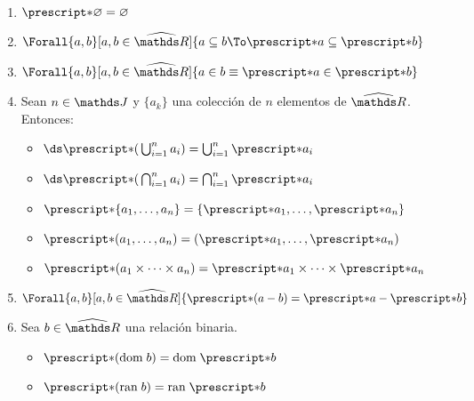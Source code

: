 \begin{lemma}\label{lema:stR}~
  \begin{enumerate}
    \item $\st{\varnothing} = \varnothing$
    \item $\Forall{a,b}[a,b\in\Rh]{a \subseteq b \To \st{a} \subseteq \st{b}}$
    \item $\Forall{a,b}[a,b\in\Rh]{a\in b \equiv \st{a} \in \st{b}}$
    \item Sean $n\in\J$ y $\{a_k\}$ una colección de $n$ elementos de
          $\Rh$. Entonces:
          \begin{itemize}
            \item $\ds\st{\left(\,\bigcup_{i=1}^n a_i\right)}=\bigcup_{i=1}^n \st{a_i}$
            \item $\ds\st{\left(\,\bigcap_{i=1}^n a_i\right)}=\bigcap_{i=1}^n \st{a_i}$
            \item $\st{\{a_1,\dots,a_n\}} = \{\st{a_1},\dots,\st{a_n}\}$
            \item $\st{(a_1,\dots,a_n)} = (\st{a_1},\dots,\st{a_n})$
            \item $\st{(a_1 \times \dots \times a_n)} = 
                    \st{a_1} \times \dots \times \st{a_n}$
          \end{itemize}
    \item $\Forall{a,b}[a,b\in\Rh]{\st{(a - b)} = \st{a} - \st{b}}$
    \item Sea $b\in\Rh$ una relación binaria.
          \begin{itemize}
            \item $\st{(\dom b)} = \dom \st{b}$
            \item $\st{(\ran b)} = \ran \st{b}$
          \end{itemize}
  \end{enumerate}
\end{lemma}
\pagebreak
